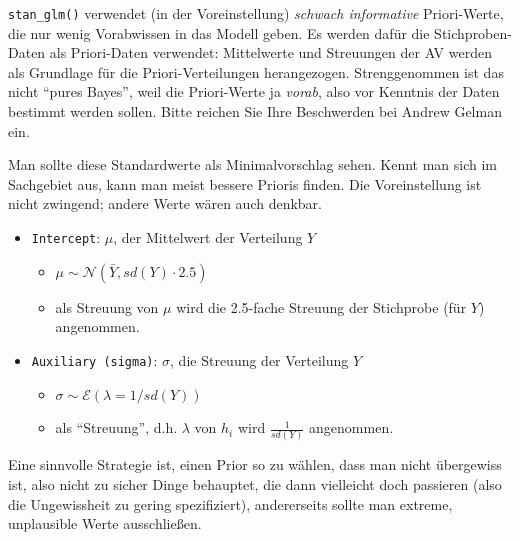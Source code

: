 \documentclass[
  a4paper,
  DIV=11]{scrreprt}
\providecommand{\tightlist}{%
  \setlength{\itemsep}{0pt}\setlength{\parskip}{0pt}}\usepackage{longtable,booktabs,array}
\theoremstyle{definition}
\theoremstyle{remark}
\begin{document}
\texttt{stan\_glm()} verwendet (in der Voreinstellung) \emph{schwach
informative} Priori-Werte, die nur wenig Vorabwissen in das Modell
geben. Es werden dafür die Stichproben-Daten als Priori-Daten verwendet:
Mittelwerte und Streuungen der AV werden als Grundlage für die
Priori-Verteilungen herangezogen. Strenggenommen ist das nicht ``pures
Bayes'', weil die Priori-Werte ja \emph{vorab}, also vor Kenntnis der
Daten bestimmt werden sollen. Bitte reichen Sie Ihre Beschwerden bei
Andrew Gelman ein.

Man sollte diese Standardwerte als Minimalvorschlag sehen. Kennt man
sich im Sachgebiet aus, kann man meist bessere Prioris finden. Die
Voreinstellung ist nicht zwingend; andere Werte wären auch denkbar.

\begin{itemize}
\tightlist
\item
  \texttt{Intercept}: \(\mu\), der Mittelwert der Verteilung \(Y\)

  \begin{itemize}
  \tightlist
  \item
    \(\mu \sim \mathcal{N}(\bar{Y}, sd(Y)\cdot 2.5)\)
  \item
    als Streuung von \(\mu\) wird die 2.5-fache Streuung der Stichprobe
    (für \(Y\)) angenommen.
  \end{itemize}
\item
  \texttt{Auxiliary\ (sigma)}: \(\sigma\), die Streuung der Verteilung
  \(Y\)

  \begin{itemize}
  \tightlist
  \item
    \(\sigma \sim \mathcal{E}(\lambda=1/sd(Y))\)
  \item
    als ``Streuung'', d.h. \(\lambda\) von \(h_i\) wird
    \(\frac{1}{sd(Y)}\) angenommen.
  \end{itemize}
\end{itemize}

Eine sinnvolle Strategie ist, einen Prior so zu wählen, dass man nicht
übergewiss ist, also nicht zu sicher Dinge behauptet, die dann
vielleicht doch passieren (also die Ungewissheit zu gering
spezifiziert), andererseits sollte man extreme, unplausible Werte
ausschließen.
\end{document}
